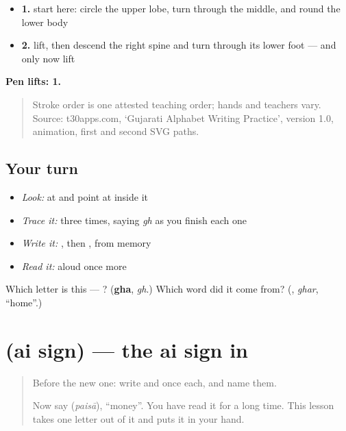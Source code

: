 \begin{itemize}
\raggedright
  \item \textbf{1.} start here: circle the upper lobe, turn through the middle, and round the lower body
  \item \textbf{2.} lift, then descend the right spine and turn through its lower foot — and only now lift
\end{itemize}

\textbf{Pen lifts: 1.}

\begin{quote}
Stroke order is one attested teaching order; hands and teachers vary. Source: t30apps.com, ‘Gujarati Alphabet Writing Practice’, version 1.0,  animation, first and second SVG paths.
\end{quote}

\subsection*{Your turn}
\begin{itemize}
\raggedright
  \item \emph{Look:} at \textbf{} and point at  inside it
  \item \emph{Trace it:}  three times, saying \emph{gh} as you finish each one
  \item \emph{Write it:} , then , from memory
  \item \emph{Read it:} \textbf{} aloud once more
\end{itemize}

\begin{tcolorbox}[breakable,colback=teal!4,colframe=teal!35!black,title={Before you move on}]
Which letter is this — ? (\textbf{gha}, \emph{gh}.) Which word did it come from? (\textbf{}, \emph{ghar}, \textquotedblleft{}home\textquotedblright{}.)
\end{tcolorbox}
\section[\texorpdfstring{\gu{ૈ} (ai sign)}{ૈ (ai sign)}]{ (ai sign) — the ai sign in }

\label{lesson:GU-W45-ai-sign}



\begin{quote}
Before the new one: write  and  once each, and name them.

Now say \textbf{} (\emph{paisā}), \textquotedblleft{}money\textquotedblright{}. You have read it for a long time. This lesson takes one letter out of it and puts it in your hand.
\end{quote}


